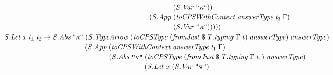 \documentclass[10pt]{article}
\newcommand{\Conid}[1]{\mathit{#1}}
\newcommand{\Varid}[1]{\mathit{#1}}
\begin{document}
\begin{hscode}
${\hskip1.00em\relax\hskip1.00em\relax\phantom{\Conid{\Conid{S}.If}\;\Varid{t}_{1}\;\Varid{t}_{2}\;\Varid{t}_{3}\to \Conid{\Conid{S}.Abs}\;\text{``}\kappa\text{``}\;\mbox{}}\phantom{(\Conid{\Conid{S}.App}\;\mbox{}}\phantom{(\Conid{\Conid{S}.Abs}\;\text{\tt \char34 v\char34}\;\mbox{}}\hskip1.00em\relax\phantom{(\Conid{\Conid{S}.App}\;\mbox{}}(\Conid{\Conid{S}.Var}\;\text{``}\kappa\text{``}))\;}$\\
${\hskip1.00em\relax\hskip1.00em\relax\phantom{\Conid{\Conid{S}.If}\;\Varid{t}_{1}\;\Varid{t}_{2}\;\Varid{t}_{3}\to \Conid{\Conid{S}.Abs}\;\text{``}\kappa\text{``}\;\mbox{}}\phantom{(\Conid{\Conid{S}.App}\;\mbox{}}\phantom{(\Conid{\Conid{S}.Abs}\;\text{\tt \char34 v\char34}\;\mbox{}}\hskip1.00em\relax(\Conid{\Conid{S}.App}\;(\Varid{toCPSWithContext}\;\Varid{answerType}\;\Varid{t}_{3}\;\Gamma)\;}$\\
${\hskip1.00em\relax\hskip1.00em\relax\phantom{\Conid{\Conid{S}.If}\;\Varid{t}_{1}\;\Varid{t}_{2}\;\Varid{t}_{3}\to \Conid{\Conid{S}.Abs}\;\text{``}\kappa\text{``}\;\mbox{}}\phantom{(\Conid{\Conid{S}.App}\;\mbox{}}\phantom{(\Conid{\Conid{S}.Abs}\;\text{\tt \char34 v\char34}\;\mbox{}}\hskip1.00em\relax\phantom{(\Conid{\Conid{S}.App}\;\mbox{}}(\Conid{\Conid{S}.Var}\;\text{``}\kappa\text{``})))))}$\\
${\hskip1.00em\relax\hskip1.00em\relax\Conid{\Conid{S}.Let}\;\Varid{x}\;\Varid{t}_{1}\;\Varid{t}_{2}\to \Conid{\Conid{S}.Abs}\;\text{``}\kappa\text{``}\;(\Conid{\Conid{S}.TypeArrow}\;(\Varid{toCPSType}\;(\Varid{fromJust}\mathbin{\$}\Varid{\Conid{T}.typing}\;\Gamma\;\Varid{t})\;\Varid{answerType})\;\Varid{answerType})\;}$\\
${\hskip1.00em\relax\hskip1.00em\relax\phantom{\Conid{\Conid{S}.Let}\;\Varid{x}\;\Varid{t}_{1}\;\Varid{t}_{2}\to \Conid{\Conid{S}.Abs}\;\text{``}\kappa\text{``}\;\mbox{}}(\Conid{\Conid{S}.App}\;(\Varid{toCPSWithContext}\;\Varid{answerType}\;\Varid{t}_{1}\;\Gamma)\;}$\\
${\hskip1.00em\relax\hskip1.00em\relax\phantom{\Conid{\Conid{S}.Let}\;\Varid{x}\;\Varid{t}_{1}\;\Varid{t}_{2}\to \Conid{\Conid{S}.Abs}\;\text{``}\kappa\text{``}\;\mbox{}}\phantom{(\Conid{\Conid{S}.App}\;\mbox{}}(\Conid{\Conid{S}.Abs}\;\text{\tt \char34 v\char34}\;(\Varid{toCPSType}\;(\Varid{fromJust}\mathbin{\$}\Varid{\Conid{T}.typing}\;\Gamma\;\Varid{t}_{1})\;\Varid{answerType})\;}$\\
${\hskip1.00em\relax\hskip1.00em\relax\phantom{\Conid{\Conid{S}.Let}\;\Varid{x}\;\Varid{t}_{1}\;\Varid{t}_{2}\to \Conid{\Conid{S}.Abs}\;\text{``}\kappa\text{``}\;\mbox{}}\phantom{(\Conid{\Conid{S}.App}\;\mbox{}}\phantom{(\Conid{\Conid{S}.Abs}\;\text{\tt \char34 v\char34}\;\mbox{}}(\Conid{\Conid{S}.Let}\;\Varid{x}\;(\Conid{\Conid{S}.Var}\;\text{\tt \char34 v\char34})\;}$\\

\end{hscode}
\end{document}
